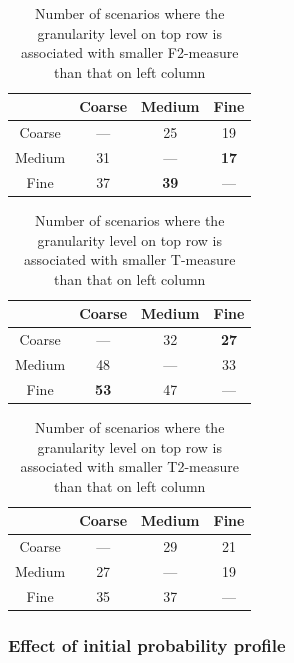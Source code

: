 \documentclass[10pt,journal,compsoc]{IEEEtran}
\begin{document}
\begin{table}
\caption{Number of scenarios where the granularity level on top row is associated with smaller F2-measure than that on left column}
\label{tab:GstaF2}
\centering
\begin{tabular}{|c|c|c|c|} \hline
				& Coarse			& Medium			& Fine				    \\ \hline
Coarse	& ---					& 25					& 19					\\ \hline
Medium	& 31					& ---					& \textbf{17}	        \\ \hline
Fine	& 37					& \textbf{39}	        & ---					\\ \hline
\end{tabular}
\end{table}

\begin{table}
\caption{Number of scenarios where the granularity level on top row is associated with smaller T-measure than that on left column}
\label{tab:GstaT}
\centering
\begin{tabular}{|c|c|c|c|} \hline
		& Coarse			& Medium			& Fine				  \\ \hline
Coarse	& ---				& 32				& \textbf{27}	      \\ \hline
Medium	& 48				& ---				& 33					\\ \hline
Fine		& \textbf{53}	& 47				& ---					\\ \hline
\end{tabular}
\end{table}

\begin{table}
\caption{Number of scenarios where the granularity level on top row is associated with smaller T2-measure than that on left column}
\label{tab:GstaT2}
\centering
\begin{tabular}{|c|c|c|c|} \hline
				& Coarse			& Medium			& Fine				\\ \hline
Coarse	& ---					& 29					& 21					\\ \hline
Medium	& 27					& ---					& 19					\\ \hline
Fine		& 35					& 37					& ---					\\ \hline
\end{tabular}
\end{table}

\subsubsection{Effect of initial probability profile}
\end{document}
